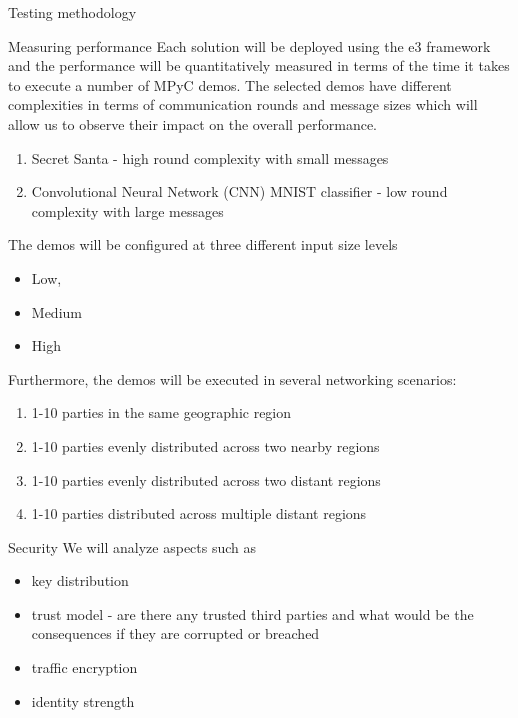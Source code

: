 \begin{frame}{Testing methodology}
\begin{block}{Measuring performance}
Each solution will be deployed using the \gls{e3} framework and the
performance will be quantitatively measured in terms of the time it
takes to execute a number of MPyC demos. The selected demos have
different complexities in terms of communication rounds and message
sizes which will allow us to observe their impact on the overall
performance.

\begin{enumerate}
\tightlist
\item
  Secret Santa - high round complexity with small messages
\item
  Convolutional Neural Network (CNN) MNIST classifier - low round
  complexity with large messages
\end{enumerate}

The demos will be configured at three different input size levels

\begin{itemize}
\tightlist
\item
  Low,
\item
  Medium
\item
  High
\end{itemize}

Furthermore, the demos will be executed in several networking scenarios:

\begin{enumerate}
\tightlist
\item
  1-10 parties in the same geographic region
\item
  1-10 parties evenly distributed across two nearby regions
\item
  1-10 parties evenly distributed across two distant regions
\item
  1-10 parties distributed across multiple distant regions
\end{enumerate}
\end{block}

\begin{block}{Security}
\protect\hypertarget{thesis__030-methods.md__security}{}
We will analyze aspects such as

\begin{itemize}
\tightlist
\item
  key distribution
\item
  trust model - are there any trusted third parties and what would be
  the consequences if they are corrupted or breached
\item
  traffic encryption
\item
  identity strength
\end{itemize}
\end{block}


\end{frame}
